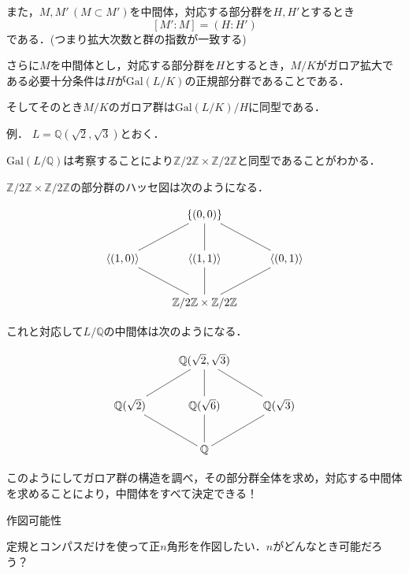 \documentclass[dvipdfmx,17pt]{beamer}
\theoremstyle{plain}
\newcommand{\Z}{\mathbb{Z}}
\newcommand{\Q}{\mathbb{Q}}
\begin{document}
\begin{frame}
また，$M, M'\, (M \subset M')$を中間体，対応する部分群を$H, H'$とするとき
\[[M': M] = (H : H')\]
である．(つまり拡大次数と群の指数が一致する)
\end{frame}

\begin{frame}
さらに$M$を中間体とし，対応する部分群を$H$とするとき，$M/K$がガロア拡大である必要十分条件は$H$が$\mathrm{Gal}(L/K)$の正規部分群であることである．

そしてそのとき$M/K$のガロア群は$\mathrm{Gal}(L/K)/H$に同型である．
\end{frame}



\begin{frame}
例． $L = \Q(\sqrt{2}, \sqrt{3})$とおく．

$\mathrm{Gal}(L/\Q)$は考察することにより$\Z/2\Z \times \Z/2\Z$と同型であることがわかる．

$\Z/2\Z \times \Z/2\Z$の部分群のハッセ図は次のようになる．


{\small
\[\xymatrix{
& \{(0,0)\} & \\
\langle(1,0)\rangle \ar@{-}[ur] & \langle(1,1)\rangle \ar@{-}[u] & \langle(0,1)\rangle \ar@{-}[ul] \\
& \Z/2\Z \times \Z/2\Z \ar@{-}[ur] \ar@{-}[u] \ar@{-}[ul]
}\]}
\end{frame}

\begin{frame}
これと対応して$L/\Q$の中間体は次のようになる．

{\small
\[\xymatrix{
& \mathbb{Q}(\sqrt 2, \sqrt 3) & \\
\mathbb{Q}(\sqrt 2) \ar@{-}[ur] & \mathbb{Q}(\sqrt 6) \ar@{-}[u] & \mathbb{Q}(\sqrt 3) \ar@{-}[ul] \\
& \mathbb{Q} \ar@{-}[ur] \ar@{-}[u] \ar@{-}[ul]
}\]}

このようにしてガロア群の構造を調べ，その部分群全体を求め，対応する中間体を求めることにより，中間体をすべて決定できる！
\end{frame}

\begin{frame}
{\huge 作図可能性}
\end{frame}

\begin{frame}
定規とコンパスだけを使って正$n$角形を作図したい．$n$がどんなとき可能だろう？
\end{frame}
\end{document}
